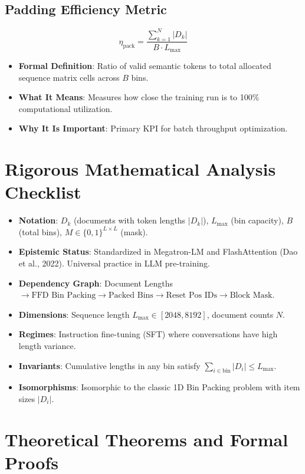 \documentclass[11pt,a4paper]{article}
\theoremstyle{definition}
\begin{document}
\subsection{Padding Efficiency Metric}
{\boldmath
\begin{equation}
\eta_{\text{pack}} = \frac{\sum_{k=1}^N |D_k|}{B \cdot L_{\max}}
\end{equation}
}
\begin{itemize}
    \item \textbf{Formal Definition}: Ratio of valid semantic tokens to total allocated sequence matrix cells across $B$ bins.
    \item \textbf{What It Means}: Measures how close the training run is to 100\% computational utilization.
    \item \textbf{Why It Is Important}: Primary KPI for batch throughput optimization.
\end{itemize}

\section{Rigorous Mathematical Analysis Checklist}

\begin{itemize}
    \item \textbf{Notation}: $D_k$ (documents with token lengths $|D_k|$), $L_{\max}$ (bin capacity), $B$ (total bins), $M \in \{0, 1\}^{L \times L}$ (mask).
    \item \textbf{Epistemic Status}: Standardized in Megatron-LM and FlashAttention (Dao et al., 2022). Universal practice in LLM pre-training.
    \item \textbf{Dependency Graph}: Document Lengths $\to \text{FFD Bin Packing} \to \text{Packed Bins} \to \text{Reset Pos IDs} \to \text{Block Mask}$.
    \item \textbf{Dimensions}: Sequence length $L_{\max} \in [2048, 8192]$, document counts $N$.
    \item \textbf{Regimes}: Instruction fine-tuning (SFT) where conversations have high length variance.
    \item \textbf{Invariants}: Cumulative lengths in any bin satisfy $\sum_{i \in \text{bin}} |D_i| \le L_{\max}$.
    \item \textbf{Isomorphisms}: Isomorphic to the classic 1D Bin Packing problem with item sizes $|D_i|$.
\end{itemize}

\section{Theoretical Theorems and Formal Proofs}
\end{document}
